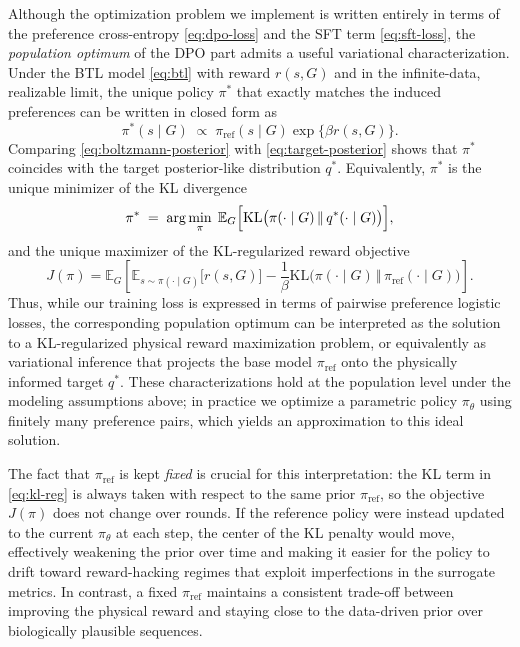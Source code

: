 {{Although the optimization problem we implement is written entirely in terms of
the preference cross-entropy \eqref{eq:dpo-loss} and the SFT term
\eqref{eq:sft-loss}, the \emph{population optimum} of the DPO part admits a
useful variational characterization. Under the BTL model \eqref{eq:btl} with
reward $r(s,G)$ and in the infinite-data, realizable limit, the unique policy
$\pi^*$ that exactly matches the induced preferences can be written in closed
form as
\begin{equation}
    \pi^*(s \mid G)
    \;\propto\;
    \pi_{\text{ref}}(s \mid G)
    \exp\bigl\{\beta r(s, G)\bigr\}.
    \label{eq:boltzmann-posterior}
\end{equation}
Comparing \eqref{eq:boltzmann-posterior} with \eqref{eq:target-posterior}
shows that $\pi^*$ coincides with the target posterior-like distribution $q^*$.
Equivalently, $\pi^*$ is the unique minimizer of the KL divergence
\begin{equation}
    \pi^* \;=\; \arg\min_{\pi} \;
    \mathbb{E}_{G}
    \Bigl[
        \mathrm{KL}\bigl(
            \pi(\cdot \mid G)
            \,\Vert\,
            q^*(\cdot \mid G)
        \bigr)
    \Bigr],
    \label{eq:kl-qstar}
\end{equation}
and the unique maximizer of the KL-regularized reward objective
\begin{equation}
    J(\pi)
    =
    \mathbb{E}_{G}
    \left[
        \mathbb{E}_{s \sim \pi(\cdot \mid G)} \bigl[r(s, G)\bigr]
        -
        \frac{1}{\beta}
        \mathrm{KL}
        \bigl(
            \pi(\cdot \mid G)
            \,\Vert\,
            \pi_{\text{ref}}(\cdot \mid G)
        \bigr)
    \right].
    \label{eq:kl-reg}
\end{equation}
Thus, while our training loss is expressed in terms of pairwise preference
logistic losses, the corresponding population optimum can be interpreted as
the solution to a KL-regularized physical reward maximization problem, or
equivalently as variational inference that projects the base model
$\pi_{\text{ref}}$ onto the physically informed target $q^*$.
These characterizations hold at the population level under the modeling
assumptions above; in practice we optimize a parametric policy $\pi_\theta$
using finitely many preference pairs, which yields an approximation to this
ideal solution.

The fact that $\pi_{\text{ref}}$ is kept \emph{fixed} is crucial for this
interpretation: the KL term in \eqref{eq:kl-reg} is always taken with respect
to the same prior $\pi_{\text{ref}}$, so the objective $J(\pi)$ does not change
over rounds. If the reference policy were instead updated to the current
$\pi_\theta$ at each step, the center of the KL penalty would move, effectively
weakening the prior over time and making it easier for the policy to drift
toward reward-hacking regimes that exploit imperfections in the surrogate
metrics. In contrast, a fixed $\pi_{\text{ref}}$ maintains a consistent
trade-off between improving the physical reward and staying close to the
data-driven prior over biologically plausible sequences.

}}
